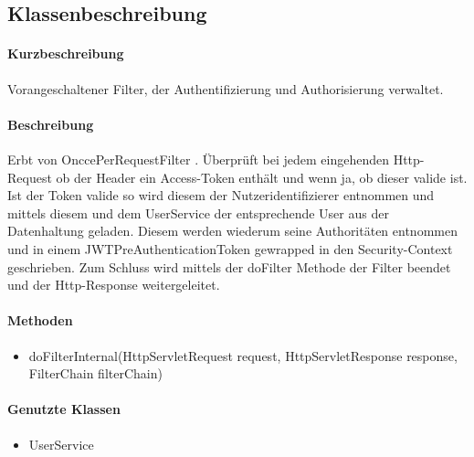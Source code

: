 \subsection{Klassenbeschreibung}%
\paragraph*{Kurzbeschreibung}
Vorangeschaltener Filter, der Authentifizierung und Authorisierung verwaltet.
\paragraph*{Beschreibung}
Erbt von \dq OnccePerRequestFilter \dq. Überprüft bei jedem eingehenden Http-Request ob der Header ein Access-Token enthält und wenn ja, ob dieser valide ist. 
Ist der Token valide so wird diesem der Nutzeridentifizierer entnommen und mittels diesem und dem UserService der entsprechende
User aus der Datenhaltung geladen. Diesem werden wiederum seine Authoritäten entnommen und in einem JWTPreAuthenticationToken gewrapped
in den Security-Context geschrieben. Zum Schluss wird mittels der \dq doFilter \dq Methode der Filter beendet und der Http-Response weitergeleitet.
\paragraph*{Methoden}
\begin{itemize}
	\item doFilterInternal(HttpServletRequest request, HttpServletResponse response, FilterChain filterChain)
\end{itemize}	
\paragraph*{Genutzte Klassen}
\begin{itemize}
	\item UserService
\end{itemize}